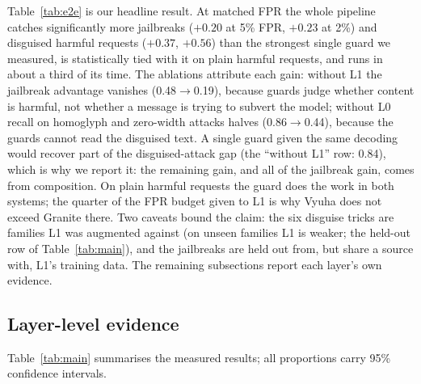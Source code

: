 \documentclass[11pt]{article}
\begin{document}
Table~\ref{tab:e2e} is our headline result. At matched FPR the whole pipeline catches significantly more
jailbreaks ($+0.20$ at 5\% FPR, $+0.23$ at 2\%) and disguised harmful requests ($+0.37$, $+0.56$) than the
strongest single guard we measured, is statistically tied with it on plain harmful requests, and runs in
about a third of its time. The ablations attribute each gain: without L1 the jailbreak advantage vanishes
(0.48$\rightarrow$0.19), because guards judge whether content is harmful, not whether a message is trying
to subvert the model; without L0 recall on homoglyph and zero-width attacks halves (0.86$\rightarrow$0.44),
because the guards cannot read the disguised text. A single guard given the same decoding would recover
part of the disguised-attack gap (the ``without L1'' row: 0.84), which is why we report it: the remaining
gain, and all of the jailbreak gain, comes from composition. On plain harmful requests the guard does the
work in both systems; the quarter of the FPR budget given to L1 is why Vyuha does not exceed Granite there.
Two caveats bound the claim: the six disguise tricks are families L1 was augmented against (on unseen
families L1 is weaker; the held-out row of Table~\ref{tab:main}), and the jailbreaks are held out from, but share a
source with, L1's training data. The remaining subsections report each layer's own evidence.

\subsection{Layer-level evidence}
Table~\ref{tab:main} summarises the measured results; all proportions carry 95\% confidence intervals.
\end{document}
